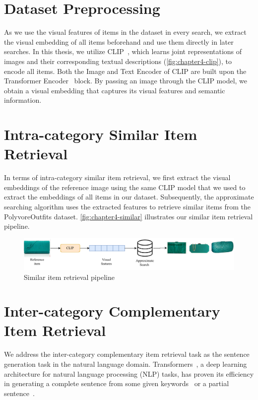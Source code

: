 \section{Dataset Preprocessing}
As we use the visual features of items in the dataset in every search, we extract the visual embedding of all items beforehand and use them directly in later searches. In this thesis, we utilize CLIP~\cite{Radford-OpenAIblog2019-Language}, which learns joint representations of images and their corresponding textual descriptions (\autoref{fig:chapter4-clip}), to encode all items. Both the Image and Text Encoder of CLIP are built upon the Transformer Encoder~\cite{Vaswani-NeurIPS2017-Attention} block. By passing an image through the CLIP model, we obtain a visual embedding that captures its visual features and semantic information.


\section{Intra-category Similar Item Retrieval}
In terms of intra-category similar item retrieval, we first extract the visual embeddings of the reference image using the same CLIP model that we used to extract the embeddings of all items in our dataset. Subsequently, the approximate searching algorithm uses the extracted features to retrieve similar items from the PolyvoreOutfits dataset. \autoref{fig:chapter4-similar} illustrates our similar item retrieval pipeline.

\begin{figure}[h!]
    \centering
    \includegraphics[width=\linewidth]{content/resources/images/fashion-recommendation/chapter4-similar.pdf}
    \caption{Similar item retrieval pipeline}
    \label{fig:chapter4-similar}
\end{figure}

\section{Inter-category Complementary Item Retrieval}
We address the inter-category complementary item retrieval task as the sentence generation task in the natural language domain. Transformers~\cite{Vaswani-NeurIPS2017-Attention}, a deep learning architecture for natural language processing (NLP) tasks, has proven its efficiency in generating a complete sentence from some given keywords~\cite{bhatia-github-keytotext} or a partial sentence~\cite{Devlin-ArXiv2018-BERT}.

